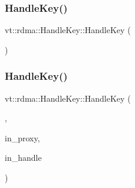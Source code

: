 \subsubsection{\texorpdfstring{Handle\+Key()}{HandleKey()}\hspace{0.1cm}{\footnotesize\ttfamily [1/3]}}
{\footnotesize\ttfamily vt\+::rdma\+::\+Handle\+Key\+::\+Handle\+Key (\begin{DoxyParamCaption}{ }\end{DoxyParamCaption})\hspace{0.3cm}{\ttfamily [default]}}

\mbox{\label{structvt_1_1rdma_1_1_handle_key_a73ee0c4261ec7b7e007cb8da8b2ff86f}} 
\subsubsection{\texorpdfstring{Handle\+Key()}{HandleKey()}\hspace{0.1cm}{\footnotesize\ttfamily [2/3]}}
{\footnotesize\ttfamily vt\+::rdma\+::\+Handle\+Key\+::\+Handle\+Key (\begin{DoxyParamCaption}\item[{\hyperlink{structvt_1_1rdma_1_1_handle_key_1_1_obj_group_tag}{Obj\+Group\+Tag}}]{,  }\item[{\hyperlink{namespacevt_ad7cae989df485fccca57f0792a880a8e}{Obj\+Group\+Proxy\+Type}}]{in\+\_\+proxy,  }\item[{\hyperlink{namespacevt_a10442579ec4e7ebef223818e64bcf908}{R\+D\+M\+A\+\_\+\+Handle\+Type}}]{in\+\_\+handle }\end{DoxyParamCaption})\hspace{0.3cm}{\ttfamily [inline]}}

\mbox{\label{structvt_1_1rdma_1_1_handle_key_a0fe8e2149d12df5aaa6cd7d9da08dd31}} 
